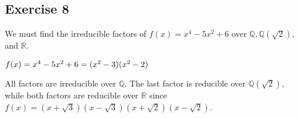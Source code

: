 \subsection*{Exercise 8}
We must find the irreducible factors of $f(x) = x^4 - 5x^2 + 6$ over $\mathbb{Q}, \mathbb{Q}(\sqrt{2}),$ and $\mathbb{R}$.

$f(x) = x^4 - 5x^2 + 6 \\
= (x^2 - 3)(x^2 - 2)$

All factors are irreducible over $\mathbb{Q}$. The last factor is reducible over $\mathbb{Q}(\sqrt{2})$, while both factors are reducible over $\mathbb{R}$ since $f(x) = (x + \sqrt{3})(x - \sqrt{3})(x + \sqrt{2})(x - \sqrt{2})$.
